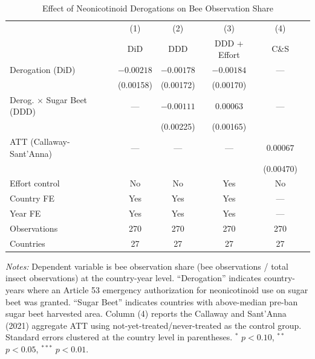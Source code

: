 \begin{table}[htbp]
\centering
\caption{Effect of Neonicotinoid Derogations on Bee Observation Share}
\label{tab:main}
\begin{threeparttable}
\begin{tabular}{lccccc}
\toprule
 & (1) & (2) & (3) & (4) \\
 & DiD & DDD & DDD + Effort & C\&S \\
\midrule
Derogation (DiD) & $-0.00218$ & $-0.00178$ & $-0.00184$ & --- \\
 & (0.00158) & (0.00172) & (0.00170) & \\
Derog. $\times$ Sugar Beet (DDD) & --- & $-0.00111$ & $0.00063$ & --- \\
 & & (0.00225) & (0.00165) & \\
ATT (Callaway-Sant'Anna) & --- & --- & --- & $0.00067$ \\
 & & & & (0.00470) \\
\midrule
Effort control & No & No & Yes & No \\
Country FE & Yes & Yes & Yes & --- \\
Year FE & Yes & Yes & Yes & --- \\
Observations & 270 & 270 & 270 & 270 \\
Countries & 27 & 27 & 27 & 27 \\
\bottomrule
\end{tabular}
\begin{tablenotes}[flushleft]
\small
\item \textit{Notes:} Dependent variable is bee observation share (bee observations / total insect observations) at the country-year level. ``Derogation'' indicates country-years where an Article 53 emergency authorization for neonicotinoid use on sugar beet was granted. ``Sugar Beet'' indicates countries with above-median pre-ban sugar beet harvested area. Column (4) reports the Callaway and Sant'Anna (2021) aggregate ATT using not-yet-treated/never-treated as the control group. Standard errors clustered at the country level in parentheses. $^{*}$ $p<0.10$, $^{**}$ $p<0.05$, $^{***}$ $p<0.01$.
\end{tablenotes}
\end{threeparttable}
\end{table}

